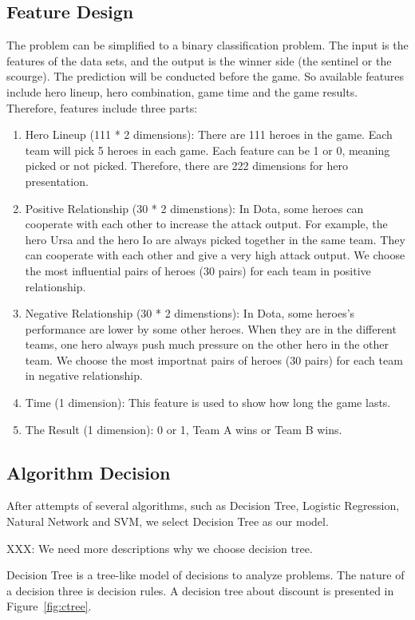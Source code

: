 \documentclass{article}
\begin{document}
\subsection{Feature Design}
The problem can be simplified to a binary classification problem.
The input is the features of the data sets, and the output is the winner side (the sentinel or the scourge).
The prediction will be conducted before the game.
So available features include hero lineup, hero combination, game time and the game results.
Therefore, features include three parts: 
\begin{enumerate}
\item Hero Lineup (111 * 2 dimensions): There are 111 heroes in the game.
Each team will pick 5 heroes in each game.
Each feature can be 1 or 0, meaning picked or not picked.
Therefore, there are 222 dimensions for hero presentation.
\item Positive Relationship (30 * 2 dimenstions):
In Dota, some heroes can cooperate with each other to increase the attack output.
For example, the hero Ursa and the hero Io are always picked together in the same team.
They can cooperate with each other and give a very high attack output.
We choose the most influential pairs of heroes (30 pairs) for each team in positive relationship.
\item Negative Relationship (30 * 2 dimenstions):
In Dota, some heroes's performance are lower by some other heroes.
When they are in the different teams, one hero always push much pressure on the other hero in the other team.
We choose the most importnat pairs of heroes (30 pairs) for each team in negative relationship.
\item Time (1 dimension):
This feature is used to show how long the game lasts.
\item The Result (1 dimension): 0 or 1, Team A wins or Team B wins.
\end{enumerate}
\subsection{Algorithm Decision}

After attempts of several algorithms, such as Decision Tree, Logistic Regression, Natural Network and SVM, we select Decision Tree as our model.
 

XXX: We need more descriptions why we choose decision tree.


Decision Tree is a tree-like model of decisions to analyze problems.
 The nature of a decision three is decision rules.
 A decision tree about discount is presented in Figure~\ref{fig:ctree}.
\end{document}
